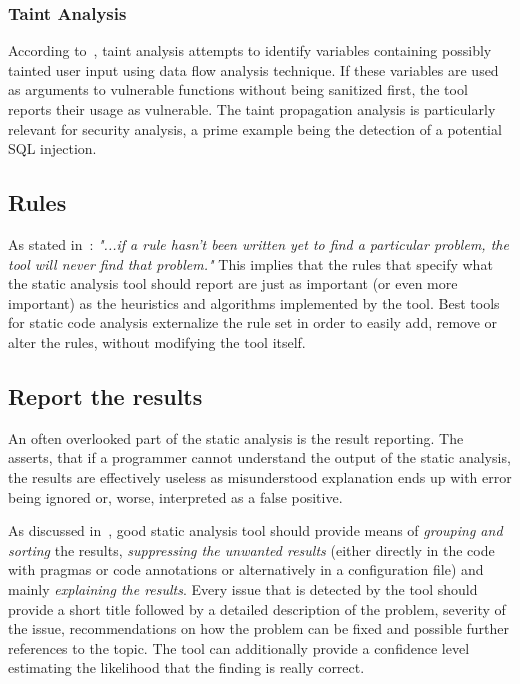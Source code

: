 \documentclass[
  digital, %
  table,   %
  lof,     %
  lot,     %
  oneside,
]{fithesis3}
\begin{document}
\subsubsection{Taint Analysis}
According to~\cite{oswap-sca}, taint analysis attempts to identify variables containing possibly tainted user input using data flow analysis technique. If these variables are used as arguments to vulnerable functions without being sanitized first, the tool reports their usage as vulnerable. The taint propagation analysis is particularly relevant for security analysis, a prime example being the detection of a potential SQL injection.

\subsection{Rules}
As stated in~\cite{sca-for-security}: \textit{"...if a rule hasn’t been written yet to find a particular problem, the tool will never find that problem."} This implies that the rules that specify what the static analysis tool should report are just as important (or even more important) as the heuristics and algorithms implemented by the tool. Best tools for static code analysis externalize the rule set in order to easily add, remove or alter the rules, without modifying the tool itself.

\subsection{Report the results}
An often overlooked part of the static analysis is the result reporting. The~\cite{coverity-sca} asserts, that if a programmer cannot understand the output of the static analysis, the results are effectively useless as misunderstood explanation ends up with error being ignored or, worse, interpreted as a false positive.

As discussed in~\cite{security-programming-sca}, good static analysis tool should provide means of \textit{grouping and sorting} the results, \textit{suppressing the unwanted results} (either directly in the code with pragmas or code annotations or alternatively in a configuration file) and mainly \textit{explaining the results}. Every issue that is detected by the tool should provide a short title followed by a detailed description of the problem, severity of the issue, recommendations on how the problem can be fixed and possible further references to the topic. The tool can additionally provide a confidence level estimating the likelihood that the finding is really correct.
\end{document}
